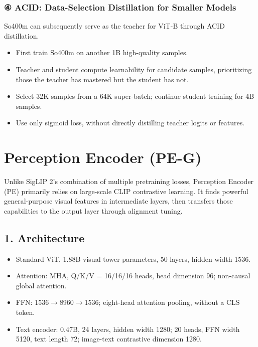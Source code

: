 \subsubsection{{④} ACID: Data-\allowbreak{}Selection Distillation for Smaller Models}
So400m can subsequently serve as the teacher for ViT-\allowbreak{}B through ACID distillation.\allowbreak{}\par
\begin{itemize}
\item First train So400m on another 1B high-\allowbreak{}quality samples.\allowbreak{}
\item Teacher and student compute learnability for candidate samples, prioritizing those the teacher has mastered but the student has not.\allowbreak{}
\item Select 32K samples from a 64K super-\allowbreak{}batch; continue student training for 4B samples.\allowbreak{}
\item Use only sigmoid loss, without directly distilling teacher logits or features.\allowbreak{}
\end{itemize}
\clearpage
{}
\section{Perception Encoder (PE-\allowbreak{}G)}
Unlike SigLIP 2's combination of multiple pretraining losses, Perception Encoder (PE) primarily relies on large-\allowbreak{}scale CLIP contrastive learning.\allowbreak{} It finds powerful general-\allowbreak{}purpose visual features in intermediate layers, then transfers those capabilities to the output layer through alignment tuning.\allowbreak{}\par
{}
\subsection{1.\allowbreak{} Architecture}
\begin{itemize}
\item Standard ViT, 1.\allowbreak{}88B visual-\allowbreak{}tower parameters, 50 layers, hidden width 1536.\allowbreak{}
\item Attention: MHA, Q/\allowbreak{}K/\allowbreak{}V =\allowbreak{} 16/\allowbreak{}16/\allowbreak{}16 heads, head dimension 96; non-\allowbreak{}causal global attention.\allowbreak{}
\item FFN: 1536\(\rightarrow\)8960\(\rightarrow\)1536; eight-\allowbreak{}head attention pooling, without a CLS token.\allowbreak{}
\item Text encoder: 0.\allowbreak{}47B, 24 layers, hidden width 1280; 20 heads, FFN width 5120, text length 72; image-\allowbreak{}text contrastive dimension 1280.\allowbreak{}
\end{itemize}
